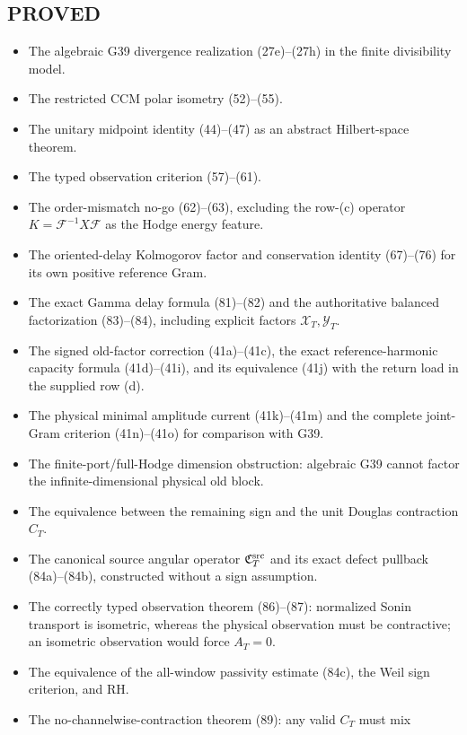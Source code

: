 \documentclass[11pt]{article}
\begin{document}
\subsection*{PROVED}
\begin{itemize}
\item The algebraic G39 divergence realization (27e)--(27h) in the finite
      divisibility model.
\item The restricted CCM polar isometry (52)--(55).
\item The unitary midpoint identity (44)--(47) as an abstract Hilbert-space
      theorem.
\item The typed observation criterion (57)--(61).
\item The order-mismatch no-go (62)--(63), excluding the row-(c) operator
      $K=\mathcal F^{-1}X\mathcal F$ as the Hodge energy feature.
\item The oriented-delay Kolmogorov factor and conservation identity
      (67)--(76) for its own positive reference Gram.
\item The exact Gamma delay formula (81)--(82) and the authoritative balanced
      factorization (83)--(84), including explicit factors
      $\mathcal X_T,\mathcal Y_T$.
\item The signed old-factor correction (41a)--(41c), the exact
      reference-harmonic capacity formula (41d)--(41i), and its equivalence
      (41j) with the return load in the supplied row (d).
\item The physical minimal amplitude current (41k)--(41m) and the complete
      joint-Gram criterion (41n)--(41o) for comparison with G39.
\item The finite-port/full-Hodge dimension obstruction: algebraic G39 cannot
      factor the infinite-dimensional physical old block.
\item The equivalence between the remaining sign and the unit Douglas
      contraction $C_T$.
\item The canonical source angular operator
      $\mathfrak C_T^{\rm src}$ and its exact defect pullback
      (84a)--(84b), constructed without a sign assumption.
\item The correctly typed observation theorem (86)--(87): normalized Sonin
      transport is isometric, whereas the physical observation must be
      contractive; an isometric observation would force $A_T=0$.
\item The equivalence of the all-window passivity estimate (84c), the Weil
      sign criterion, and RH.
\item The no-channelwise-contraction theorem (89): any valid $C_T$ must mix

\end{itemize}
\end{document}
